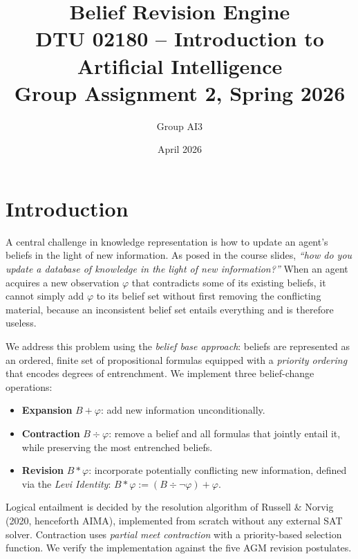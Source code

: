 \documentclass[11pt,a4paper]{article}
\title{\textbf{Belief Revision Engine}\\
       \large DTU 02180 – Introduction to Artificial Intelligence\\
       Group Assignment 2, Spring 2026}
\author{Group AI3}
\date{April 2026}
\newcommand{\contraction}{\mathbin{\div}}
\newcommand{\revision}{\mathbin{*}}
\newcommand{\expansion}{\mathbin{+}}
\newcommand{\lneg}{\neg}
\begin{document}
\maketitle
\tableofcontents
\newpage

\section{Introduction}

A central challenge in knowledge representation is how to update an agent's
beliefs in the light of new information.
As posed in the course slides, \emph{``how do you update a database of knowledge
in the light of new information?''}
When an agent acquires a new observation $\varphi$ that contradicts some of its
existing beliefs, it cannot simply add $\varphi$ to its belief set without
first removing the conflicting material, because an inconsistent belief set
entails everything and is therefore useless.

We address this problem using the \emph{belief base approach}:
beliefs are represented as an ordered, finite set of propositional formulas
equipped with a \emph{priority ordering} that encodes degrees of entrenchment.
We implement three belief-change operations:

\begin{itemize}[noitemsep]
  \item \textbf{Expansion} $B \expansion \varphi$: add new information unconditionally.
  \item \textbf{Contraction} $B \contraction \varphi$: remove a belief and all formulas that
        jointly entail it, while preserving the most entrenched beliefs.
  \item \textbf{Revision} $B \revision \varphi$: incorporate potentially conflicting
        new information, defined via the \emph{Levi Identity}:
        $B \revision \varphi := (B \contraction \lneg\varphi) \expansion \varphi$.
\end{itemize}

Logical entailment is decided by the resolution algorithm of Russell \& Norvig
(2020, henceforth AIMA), implemented from scratch without any external SAT solver.
Contraction uses \emph{partial meet contraction} with a priority-based selection
function.  We verify the implementation against the five AGM revision postulates.

\end{document}
